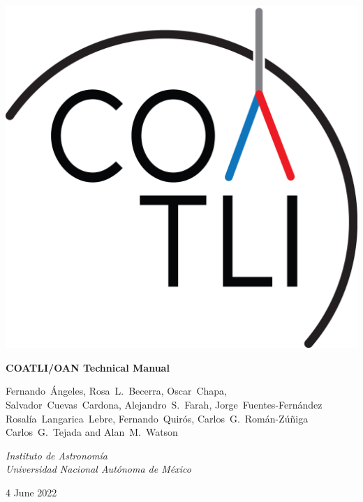 
\pagestyle{empty}

\begin{centering}

\ifcoatli
\bigskip
\bigskip
\includegraphics[width=\linewidth]{figures/logo-gn.png}
\bigskip
\bigskip
{
 \Large
 \bfseries 
 COATLI/OAN Technical Manual
 \par
}
\bigskip
{
\baselineskip=10pt
 \large
 Fernando~Ángeles,
 Rosa~L.~Becerra,
 Oscar~Chapa,\\
 Salvador~Cuevas~Cardona,
 Alejandro~S.~Farah,
 Jorge~Fuentes-Fernández\\
 Rosalía~Langarica~Lebre,
 Fernando~Quirós,
 Carlos~G.~Román-Zúñiga\\
 Carlos~G.~Tejada
 and
 Alan~M.~Watson
 \par
}
\bigskip
{
 \large
 \itshape 
 Instituto de Astronomía\\
 Universidad Nacional Autónoma de México
 \par
}
\bigskip
{
 \large
 4 June 2022
}
\fi

\ifddoti
\bigskip
\bigskip


\end{centering}
